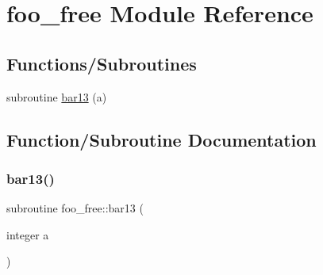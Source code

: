 \hypertarget{namespacefoo__free}{}\section{foo\+\_\+free Module Reference}
\label{namespacefoo__free}
\subsection*{Functions/\+Subroutines}
\begin{DoxyCompactItemize}
\item 
subroutine \hyperlink{namespacefoo__free_a896f43467e09f09908fe94adde2e80e8}{bar13} (a)
\end{DoxyCompactItemize}


\subsection{Function/\+Subroutine Documentation}
\mbox{\label{namespacefoo__free_a896f43467e09f09908fe94adde2e80e8}} 
\subsubsection{\texorpdfstring{bar13()}{bar13()}}
{\footnotesize\ttfamily subroutine foo\+\_\+free\+::bar13 (\begin{DoxyParamCaption}\item[{integer}]{a }\end{DoxyParamCaption})}

